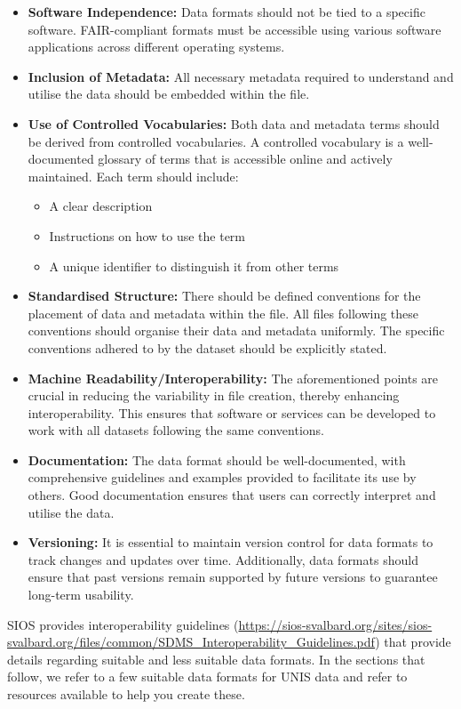 \documentclass[a4paper,12pt]{article}
\begin{document}
\begin{itemize}
\item \textbf{Software Independence:} Data formats should not be tied to a specific software. FAIR-compliant formats must be accessible using various software applications across different operating systems.
\item \textbf{Inclusion of Metadata:} All necessary metadata required to understand and utilise the data should be embedded within the file.
\item \textbf{Use of Controlled Vocabularies:} Both data and metadata terms should be derived from controlled vocabularies. A controlled vocabulary is a well-documented glossary of terms that is accessible online and actively maintained. Each term should include:
\begin{itemize}
\item A clear description
\item Instructions on how to use the term
\item A unique identifier to distinguish it from other terms
\end{itemize}
\item \textbf{Standardised Structure:} There should be defined conventions for the placement of data and metadata within the file. All files following these conventions should organise their data and metadata uniformly. The specific conventions adhered to by the dataset should be explicitly stated.
\item \textbf{Machine Readability/Interoperability:} The aforementioned points are crucial in reducing the variability in file creation, thereby enhancing interoperability. This ensures that software or services can be developed to work with all datasets following the same conventions.
\item \textbf{Documentation:} The data format should be well-documented, with comprehensive guidelines and examples provided to facilitate its use by others. Good documentation ensures that users can correctly interpret and utilise the data.
\item \textbf{Versioning:} It is essential to maintain version control for data formats to track changes and updates over time. Additionally, data formats should ensure that past versions remain supported by future versions to guarantee long-term usability.
\end{itemize}

SIOS provides interoperability guidelines (\url{https://sios-svalbard.org/sites/sios-svalbard.org/files/common/SDMS_Interoperability_Guidelines.pdf}) that provide details regarding suitable and less suitable data formats. In the sections that follow, we refer to a few suitable data formats for UNIS data and refer to resources available to help you create these.
\end{document}
